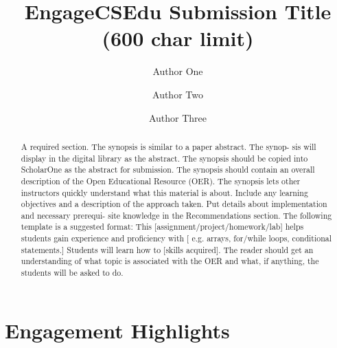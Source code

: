 \documentclass[acmengage]{acmart}
\begin{document}
\title{EngageCSEdu Submission Title (600 char limit)}
\author{Author One}

\author{Author Two}

\author{Author Three}

\begin{abstract}
A required section. The synopsis is similar to a paper abstract. The synop-
sis will display in the digital library as the abstract. The synopsis should
be copied into ScholarOne as the abstract for submission. The synopsis
should contain an overall description of the Open Educational Resource
(OER). The synopsis lets other instructors quickly understand what this
material is about. Include any learning objectives and a description of the
approach taken. Put details about implementation and necessary prerequi-
site knowledge in the Recommendations section. The following template is
a suggested format:
This [assignment/project/homework/lab] helps students gain experience
and proficiency with [ e.g. arrays, for/while loops, conditional statements.]
Students will learn how to [skills acquired].
The reader should get an understanding of what topic is associated with
the OER and what, if anything, the students will be asked to do.
\end{abstract}


\maketitle

\section{Engagement Highlights}
\end{document}
